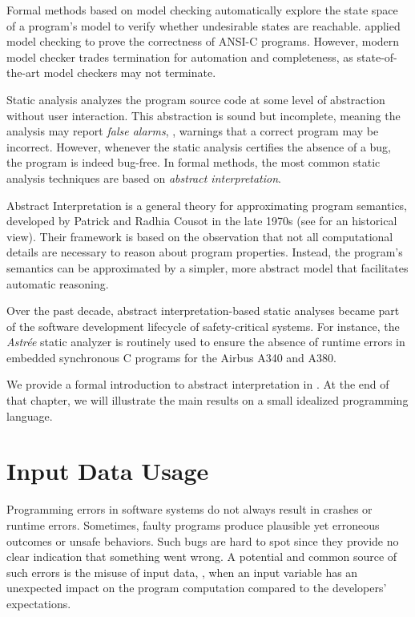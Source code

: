 Formal methods based on model checking automatically explore the state space of a program's model to verify whether undesirable states are reachable.
 applied model checking to prove the correctness of ANSI-C programs.
However, modern model checker trades termination for automation and completeness, as state-of-the-art model checkers may not terminate.

Static analysis analyzes the program source code at some level of abstraction without user interaction.
This abstraction is sound but incomplete, meaning the analysis may report \emph{false alarms}, \ie, warnings that a correct program may be incorrect.
However, whenever the static analysis certifies the absence of a bug, the program is indeed bug-free.
In formal methods, the most common static analysis techniques are based on \emph{abstract interpretation}.

Abstract Interpretation  is a general theory for approximating program semantics, developed by Patrick and Radhia Cousot in the late 1970s (see  for an historical view).
Their framework is based on the observation that not all computational details are necessary to reason about program properties.
Instead, the program's semantics can be approximated by a simpler, more abstract model that facilitates automatic reasoning.

Over the past decade, abstract interpretation-based static analyses became part of the software development lifecycle of safety-critical systems.
For instance, the \emph{Astrée} static analyzer  is routinely used to ensure the absence of runtime errors in embedded synchronous C programs for the Airbus A340 and A380.

We provide a formal introduction to abstract interpretation in .
At the end of that chapter, we will illustrate the main results on a small idealized programming language.

\section{Input Data Usage}

Programming errors in software systems do not always result in crashes or runtime errors.
Sometimes, faulty programs produce plausible yet erroneous outcomes or unsafe behaviors.
Such bugs are hard to spot since they provide no clear indication that something went wrong.
A potential and common source of such errors is the misuse of input data, \ie, when an input variable has an unexpected impact on the program computation compared to the developers' expectations.

